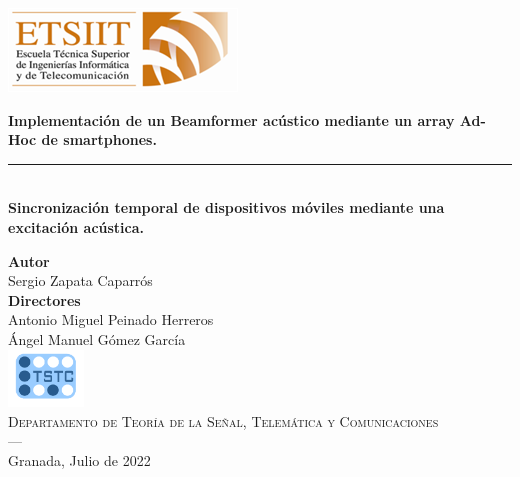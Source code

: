 \begin{titlepage}
 
 
\setlength{\centeroffset}{-0.5\oddsidemargin}
\addtolength{\centeroffset}{0.5\evensidemargin}
\thispagestyle{empty}

\noindent\hspace*{\centeroffset}\begin{minipage}{\textwidth}

\centering



 \vspace{3.3cm}

\includegraphics{imagenes/etsiit_logo.png} 
 \vspace{0.5cm}


{\LARGE\bfseries Implementación de un Beamformer acústico mediante un array Ad-Hoc de smartphones.\\
}
\noindent\rule[-1ex]{\textwidth}{3pt}\\[3.5ex]
{\large\bfseries Sincronización temporal de dispositivos móviles mediante
una excitación acústica.\\[4cm]}
\end{minipage}

\vspace{2.5cm}
\noindent\hspace*{\centeroffset}\begin{minipage}{\textwidth}
\centering

\textbf{Autor}\\ {Sergio Zapata Caparrós}\\[2.5ex]
\textbf{Directores}\\
{Antonio Miguel Peinado Herreros\\
Ángel Manuel Gómez García}\\[2cm]
\includegraphics[width=0.15\textwidth]{imagenes/tstc.png}\\[0.1cm]
\textsc{Departamento de Teoría de la Señal, Telemática y Comunicaciones}\\
\textsc{---}\\
Granada, Julio de 2022
\end{minipage}

 
\end{titlepage}



